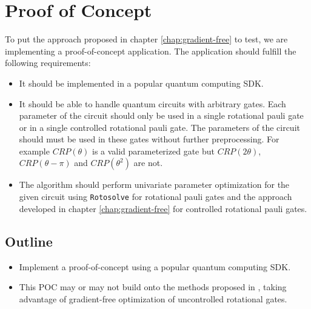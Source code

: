 \chapter{Proof of Concept}
\label{chap:proof-of-concept}

To put the approach proposed in chapter \ref{chap:gradient-free} to test,
we are implementing a proof-of-concept application.
The application should fulfill the following requirements:

\begin{itemize}
    \item
        It should be implemented in a popular quantum computing SDK.
    \item
        It should be able to handle quantum circuits with arbitrary gates.
        Each parameter of the circuit should only be used in a single rotational
        pauli gate or in a single controlled rotational pauli gate.
        The parameters of the circuit should must be used in these gates without
        further preprocessing.
        For example $CRP(\theta)$ is a valid parameterized gate but
        $CRP(2\theta)$, $CRP(\theta - \pi)$ and $CRP(\theta^2)$ are not.
    \item
        The algorithm should perform univariate parameter optimization for the
        given circuit using \texttt{Rotosolve} \cite{ostaszewski_structure_2021}
        for rotational pauli gates and the approach developed in
        chapter \ref{chap:gradient-free} for controlled rotational pauli gates.
\end{itemize}

\section{Outline}
\begin{itemize}
    \item
        Implement a proof-of-concept using a popular quantum computing SDK.
    \item
        This POC may or may not build onto the methods proposed in
        \cite{wendenius_gradient-free_2023,ostaszewski_structure_2021},
        taking advantage of gradient-free optimization of uncontrolled
        rotational gates.
\end{itemize}